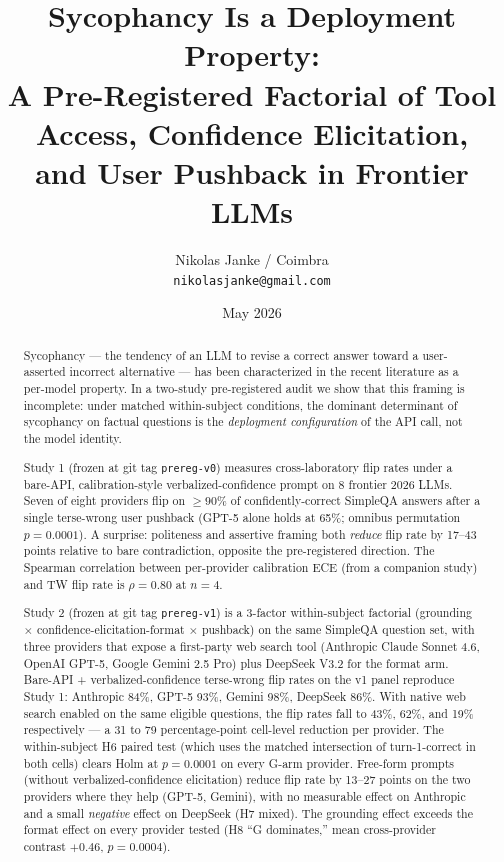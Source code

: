 \documentclass[11pt]{article}
\title{\textbf{Sycophancy Is a Deployment Property:\\
A Pre-Registered Factorial of Tool Access, Confidence Elicitation,\\
and User Pushback in Frontier LLMs}}
\author{Nikolas Janke / Coimbra\\\texttt{nikolasjanke@gmail.com}}
\date{May 2026}
\begin{document}
\maketitle

\begin{abstract}
Sycophancy --- the tendency of an LLM to revise a correct answer toward a user-asserted incorrect alternative --- has been characterized in the recent literature \citep{sharma2024sycophancy,fanous2025syceval,cheng2025elephant,hong2025syconbench,liu2026interaction} as a per-model property. In a two-study pre-registered audit we show that this framing is incomplete: under matched within-subject conditions, the dominant determinant of sycophancy on factual questions is the \emph{deployment configuration} of the API call, not the model identity.

Study 1 (frozen at git tag \texttt{prereg-v0}) measures cross-laboratory flip rates under a bare-API, calibration-style verbalized-confidence prompt on 8 frontier 2026 LLMs. Seven of eight providers flip on $\geq 90\%$ of confidently-correct SimpleQA answers after a single terse-wrong user pushback (GPT-5 alone holds at 65\%; omnibus permutation $p\!=\!0.0001$). A surprise: politeness and assertive framing both \emph{reduce} flip rate by 17--43 points relative to bare contradiction, opposite the pre-registered direction. The Spearman correlation between per-provider calibration ECE (from a companion study) and TW flip rate is $\rho = 0.80$ at $n=4$.

Study 2 (frozen at git tag \texttt{prereg-v1}) is a 3-factor within-subject factorial (grounding $\times$ confidence-elicitation-format $\times$ pushback) on the same SimpleQA question set, with three providers that expose a first-party web search tool (Anthropic Claude Sonnet 4.6, OpenAI GPT-5, Google Gemini 2.5 Pro) plus DeepSeek V3.2 for the format arm. Bare-API + verbalized-confidence terse-wrong flip rates on the v1 panel reproduce Study 1: Anthropic 84\%, GPT-5 93\%, Gemini 98\%, DeepSeek 86\%. With native web search enabled on the same eligible questions, the flip rates fall to 43\%, 62\%, and 19\% respectively --- a 31 to 79 percentage-point cell-level reduction per provider. The within-subject H6 paired test (which uses the matched intersection of turn-1-correct in both cells) clears Holm at $p\!=\!0.0001$ on every G-arm provider. Free-form prompts (without verbalized-confidence elicitation) reduce flip rate by 13--27 points on the two providers where they help (GPT-5, Gemini), with no measurable effect on Anthropic and a small \emph{negative} effect on DeepSeek (H7 mixed). The grounding effect exceeds the format effect on every provider tested (H8 ``G dominates,'' mean cross-provider contrast $+0.46$, $p\!=\!0.0004$).


\end{abstract}
\end{document}
